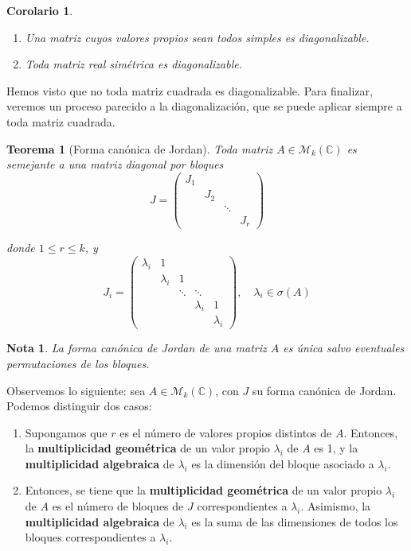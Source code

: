 \documentclass[11pt, a4paper]{article}
\newif\IfInSansMode
\numberwithin{equation}{section}
\newcommand{\la}{\lambda}
\theoremstyle{theorem-style}
\newtheorem{nth}{Teorema}[section]
\newtheorem{ncor}{Corolario}[section]
\theoremstyle{definition-style}
\theoremstyle{remark-style}
\newtheorem*{nota}{Nota}
\theoremstyle{example-style}
\newenvironment{nlist}
{\begin{enumerate}
    \renewcommand\labelenumi{(\emph{\roman{enumi})}}}
  {\end{enumerate}}
\begin{document}
\begin{ncor} \hfill
  \begin{nlist}
  \item Una matriz cuyos valores propios sean todos simples es diagonalizable.
  \item Toda matriz real simétrica es diagonalizable.
  \end{nlist}
\end{ncor}

Hemos visto que no toda matriz cuadrada es diagonalizable. Para finalizar, veremos un proceso parecido a la diagonalización, que se puede aplicar siempre a toda matriz cuadrada.

\begin{nth}[Forma canónica de Jordan]
  Toda matriz $A \in \mathcal M_k (\mathbb C)$ es semejante a una matriz
  diagonal por bloques $$ J =
  \begin{pmatrix}
    J_1 & & & \\
    & J_2 & & \\
    & & \ddots & \\
    & & & J_r
  \end{pmatrix}$$

  donde $1 \leq r \leq k$, y $$J_i = 
  \begin{pmatrix}
	\la_i & 1\\
	& \la_i & 1 \\
	& & \ddots & \ddots \\
	& & & \la_i & 1 \\
	& & & & \la_i
\end{pmatrix}, \quad \lambda_i \in \sigma(A)$$

\end{nth}

\begin{nota}
	La forma canónica de Jordan de una matriz $A$ es única salvo eventuales permutaciones de los bloques.
\end{nota}

Observemos lo siguiente: sea $A \in \mathcal M_k(\mathbb{C})$, con $J$ su forma canónica de Jordan. Podemos distinguir dos casos:

\begin{nlist}
	\item Supongamos que $r$ es el número de valores propios distintos de $A$. Entonces, la \textbf{multiplicidad geométrica} de un valor propio $\lambda_i$ de $A$ es 1, y la \textbf{multiplicidad algebraica} de $\la_i$ es la dimensión del bloque asociado a $\lambda_i$.
	
	\item Entonces, se tiene que la \textbf{multiplicidad geométrica} de un valor propio $\lambda_i$ de $A$ es el número de bloques de $J$ correspondientes a $\lambda_i$. Asimismo, la \textbf{multiplicidad algebraica} de $\lambda_i$ es la suma de las dimensiones de todos los bloques correspondientes a $\lambda_i$.
\end{nlist} 
\end{document}
